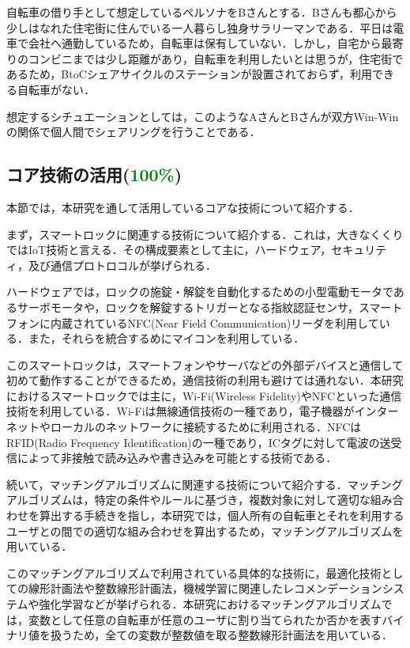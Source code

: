       \par 自転車の借り手として想定しているペルソナをBさんとする．Bさんも都心から少しはなれた住宅街に住んでいる一人暮らし独身サラリーマンである．平日は電車で会社へ通勤しているため，自転車は保有していない．しかし，自宅から最寄りのコンビニまでは少し距離があり，自転車を利用したいとは思うが，住宅街であるため，BtoCシェアサイクルのステーションが設置されておらず，利用できる自転車がない．
      \par 想定するシチュエーションとしては，このようなAさんとBさんが双方Win-Winの関係で個人間でシェアリングを行うことである．
  
  \subsection{コア技術の活用(\textcolor{green}{100\%})}
    \label{sec:コア技術の活用}
      \par 本節では，本研究を通して活用しているコアな技術について紹介する．
      \par まず，スマートロックに関連する技術について紹介する．これは，大きなくくりではIoT技術と言える．その構成要素として主に，ハードウェア，セキュリティ，及び通信プロトロコルが挙げられる．
      \par ハードウェアでは，ロックの施錠・解錠を自動化するための小型電動モータであるサーボモータや，ロックを解錠するトリガーとなる指紋認証センサ，スマートフォンに内蔵されているNFC(Near Field Communication)リーダを利用している．また，それらを統合するめにマイコンを利用している．
      \par このスマートロックは，スマートフォンやサーバなどの外部デバイスと通信して初めて動作することができるため，通信技術の利用も避けては通れない．本研究におけるスマートロックでは主に，Wi-Fi(Wireless Fidelity)やNFCといった通信技術を利用している．Wi-Fiは無線通信技術の一種であり，電子機器がインターネットやローカルのネットワークに接続するために利用される．NFCはRFID(Radio Frequency Identification)の一種であり，ICタグに対して電波の送受信によって非接触で読み込みや書き込みを可能とする技術である．
      \par 続いて，マッチングアルゴリズムに関連する技術について紹介する．マッチングアルゴリズムは，特定の条件やルールに基づき，複数対象に対して適切な組み合わせを算出する手続きを指し，本研究では，個人所有の自転車とそれを利用するユーザとの間での適切な組み合わせを算出するため，マッチングアルゴリズムを用いている．
      \par このマッチングアルゴリズムで利用されている具体的な技術に，最適化技術としての線形計画法や整数線形計画法，機械学習に関連したレコメンデーションシステムや強化学習などが挙げられる．本研究におけるマッチングアルゴリズムでは，変数として任意の自転車が任意のユーザに割り当てられたか否かを表すバイナリ値を扱うため，全ての変数が整数値を取る整数線形計画法を用いている．
